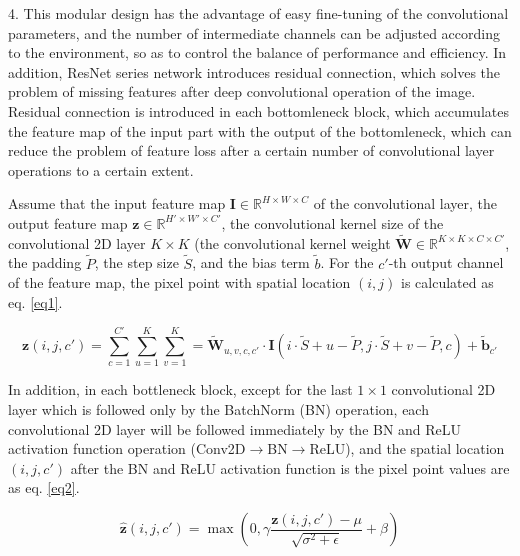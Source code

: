 4. This modular design has the advantage of easy fine-tuning of the convolutional parameters, and the number of intermediate channels can be adjusted according to the environment, so as to control the balance of performance and efficiency. In addition, ResNet series network introduces residual connection, which solves the problem of missing features after deep convolutional operation of the image. Residual connection is introduced in each bottomleneck block, which accumulates the feature map of the input part with the output of the bottomleneck, which can reduce the problem of feature loss after a certain number of convolutional layer operations to a certain extent.

Assume that the input feature map $ \mathbf{I} \in \mathbb{ R }^{ H\times W\times C } $ of the convolutional layer, the output feature map $\boldsymbol{z} \in \mathbb{ R }^{ H'\times W'\times C' }$, the convolutional kernel size of the convolutional 2D layer $K\times K$ (the convolutional kernel weight $ \tilde{\mathbf{W}} \in \mathbb{ R }^{ K\times K\times C\times C' } $, the padding $\tilde{P}$, the step size $\tilde{S}$, and the bias term $\tilde{b}$. For the $c'$-th output channel of the feature map, the pixel point with spatial location $(i,j)$ is calculated as eq. \ref{eq1}.

\begin{equation}
\label{eq1}
  \boldsymbol{z}(i, j, c') = \sum^{C'}_{c=1} \sum^K_{u=1} \sum^K_{v=1} = \tilde{\mathbf{W}}_{u, v, c, c'} \cdot \mathbf{I}(i\cdot \tilde{S}+u-\tilde{P}, j\cdot \tilde{S}+v - \tilde{P}, c) + \tilde{\mathbf{b}}_{c'}
\end{equation}

In addition, in each bottleneck block, except for the last $1\times 1$ convolutional 2D layer which is followed only by the BatchNorm (BN) \cite{16} operation, each convolutional 2D layer will be followed immediately by the BN and ReLU activation function \cite{29} operation (Conv2D$\to$BN$\to$ReLU), and the spatial location $(i,j,c')$ after the BN and ReLU activation function is the pixel point values are as eq. \ref{eq2}.

\begin{equation}
\label{eq2}
  \hat{\boldsymbol{z}}(i, j, c') = \max \left( 0, \gamma \frac{\boldsymbol{z}(i, j, c') - \mu}{\sqrt{\sigma^2+\epsilon}}+\beta \right)
\end{equation}

